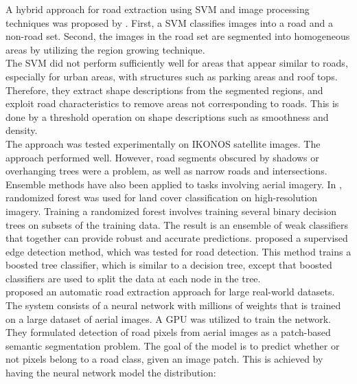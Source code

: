 A hybrid approach for road extraction using \ac{SVM} and image processing techniques was proposed by \cite{Song_road_extraction_svm}. First, a \ac{SVM} classifies images into a road and a non-road set. Second, the images in the road set are segmented into homogeneous areas by utilizing the region growing technique. \\

The \ac{SVM} did not perform sufficiently well for areas that appear similar to roads, especially for urban areas, with structures such as parking areas and roof tops. Therefore, they extract shape descriptions from the segmented regions, and exploit road characteristics to remove areas not corresponding to roads. This is done by a threshold operation on shape descriptions such as smoothness and density.\\

 The approach was tested experimentally on IKONOS satellite images. The approach performed well. However, road segments obscured by shadows or overhanging trees were a problem, as well as narrow roads and intersections.\\

Ensemble methods have also been applied to tasks involving aerial imagery. In \citep{Kluckner_semantic_height}, randomized forest was used for land cover classification on high-resolution imagery. Training a randomized forest involves training several binary decision trees on subsets of the training data. The result is an ensemble of weak classifiers that together can provide robust and accurate predictions. \cite{Dollar_supervised_edge} proposed a supervised edge detection method, which was tested for road detection. This method trains a boosted tree classifier, which is similar to a decision tree, except that boosted classifiers are used to split the data at each node in the tree.\\

\cite{Mnih_roads_high_res_aerial_images} proposed an automatic road extraction approach for large real-world datasets. The system consists of a neural network with millions of weights that is trained on a large dataset of aerial images. A \ac{GPU} was utilized to train the network.  \\

They formulated detection of road pixels from aerial images as a patch-based semantic segmentation problem. 
The goal of the model is to predict whether or not pixels belong to a road class, given an image patch. This is achieved by having the neural network model the distribution:

